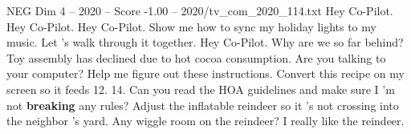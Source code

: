 \begin{textsample}{NEG Dim 4 – 2020 – Score -1.00 – 2020/tv\_com\_2020\_114.txt}  \label{ex:f4_neg_067}
Hey Co-Pilot.
Hey Co-Pilot.
Hey Co-Pilot.
Show me how to sync my holiday lights to my music.
Let 's walk through it together.
Hey Co-Pilot.
Why are we so far behind?
Toy assembly has declined due to hot cocoa consumption.
Are you talking to your computer?
Help me figure out these instructions.
Convert this recipe on my screen so it feeds 12. 14.
Can you read the HOA guidelines and make sure I 'm not \textbf{breaking} any rules?
Adjust the inflatable reindeer so it 's not crossing into the neighbor 's yard.
Any wiggle room on the reindeer?
I really like the reindeer.

\end{textsample}
